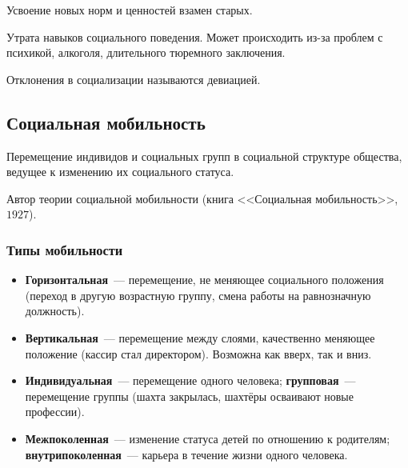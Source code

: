 \documentclass[12pt]{article}
\begin{document}
	\begin{definition}[Ресоциализация]
		Усвоение новых норм и ценностей взамен старых.
	\end{definition}

	\begin{definition}[Десоциализация]
		Утрата навыков социального поведения. Может происходить из-за проблем с психикой, алкоголя, длительного тюремного заключения.
	\end{definition}

	\begin{note}
		Отклонения в социализации называются девиацией.
	\end{note}

	\subsection{Социальная мобильность}

	\begin{definition}
		Перемещение индивидов и социальных групп в социальной структуре общества, ведущее к изменению их социального статуса.
	\end{definition}

	\begin{person}
		Автор теории социальной мобильности (книга <<Социальная мобильность>>, $1927$).
	\end{person}

	\subsubsection{Типы мобильности}

	\begin{itemize}
		\item \textbf{Горизонтальная}~--- перемещение, не меняющее социального положения (переход в другую возрастную группу, смена работы на равнозначную должность).
		\item \textbf{Вертикальная}~--- перемещение между слоями, качественно меняющее положение (кассир стал директором). Возможна как вверх, так и вниз.
		\item \textbf{Индивидуальная}~--- перемещение одного человека; \textbf{групповая}~--- перемещение группы (шахта закрылась, шахтёры осваивают новые профессии).
		\item \textbf{Межпоколенная}~--- изменение статуса детей по отношению к родителям; \textbf{внутрипоколенная}~--- карьера в течение жизни одного человека.
	\end{itemize}
\end{document}
